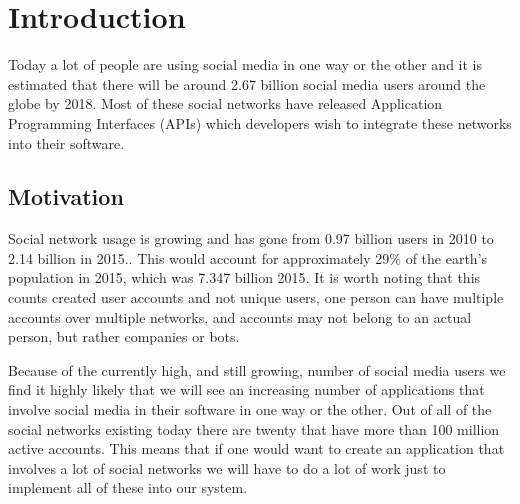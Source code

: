 \documentclass{sigchi-alternate}
\begin{document}
\title{\plaintitle}
\author{
}

\maketitle

\begin{abstract}
Coming later
\end{abstract}

\section{Introduction}
Today a lot of people are using social media in one way or the other and it is estimated that there will be around 2.67 billion social media
users around the globe by 2018\cite{STATISTA_SN_WORLD_USERS}. Most of these social networks have released Application Programming Interfaces (APIs)
which developers wish to integrate these networks into their software.
\subsection{Motivation}
Social network usage is growing and has gone from 0.97 billion users in 2010 to 2.14 billion in 2015.\cite{STATISTA_SN_WORLD_USERS}. This would
account for approximately 29\% of the earth's population in 2015, which was 7.347 billion 2015\cite{WORLD_BANK_POPULATION}. It is worth noting
that this counts created user accounts and not unique users, one person can have multiple accounts over multiple networks, and accounts may not
belong to an actual person, but rather companies or bots.

Because of the currently high, and still growing, number of social media users we find it highly likely that we will see an increasing number of
applications that involve social media in their software in one way or the other. Out of all of the social networks existing today there are twenty
that have more than 100 million active accounts\cite{STATISTA_LEADING_SOCIAL_NETWORKS}. This means that if one would want to create an application
that involves a lot of social networks we will have to do a lot of work just to implement all of these into our system.
\end{document}
